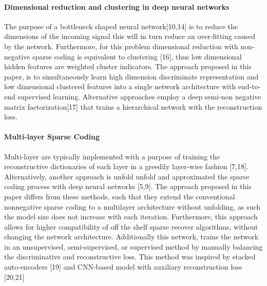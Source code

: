 \documentclass{article}
\begin{document}
\paragraph{Dimensional reduction and clustering in deep neural networks}
The purpose of a bottleneck shaped neural network[10,14] is to reduce the dimensions of the incoming signal this will in turn reduce an over-fitting caused by the network. Furthermore, for this problem dimensional reduction with non-negative sparse coding is equivalent to clustering [16], thus low dimensional hidden features are weighted cluster indicators. The approach proposed in this paper, is to simultaneously learn high dimension discriminate representation and low dimensional clustered features into a single network architecture with end-to-end supervised learning. Alternative approaches employ a deep semi-non negative matrix factorization[17] that trains a hierarchical network with the reconstruction loss.
\paragraph{Multi-layer Sparse Coding}
Multi-layer are typically implemented with a purpose of training the reconstructive dictionaries of each layer in a greedily layer-wise fashion [7,18]. Alternatively, another approach is unfold unfold and approximated the sparse  coding process with deep neural networks [5,9]. The approach proposed in this paper differs from these methods, such that they extend the conventional nonnegative sparse coding to a multilayer architecture without unfolding, as such the model size does not increase with each iteration. Furthermore, this approach allows for higher compatibility of off the shelf sparse recover algorithms, without changing the network architecture. Additionally this network, trains the network in an unsupervised, semi-supervised, or supervised method by manually balancing the discriminative and reconstructive loss. This method was inspired by stacked auto-encoders [19] and CNN-based model with auxiliary reconstruction loss [20,21]
\end{document}
